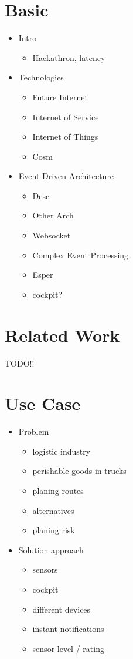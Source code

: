 \documentclass{acm_proc_article-sp}
\begin{document}
\section{Basic}
\begin{itemize}
	\item Intro
	\begin{itemize}	
	\item Hackathron, latency
	\end{itemize}
	\item Technologies
	\begin{itemize}
	\item Future Internet
	\item Internet of Service
	\item Internet of Things
	\item Cosm
	\end{itemize}
	
	\item Event-Driven Architecture	
	\begin{itemize}
	\item Desc
	\item Other Arch
	\item Websocket	
	\item Complex Event Processing	
	\item Esper
	\item cockpit?
	\end{itemize}

\end{itemize}


\section{Related Work}

TODO!!

\section{Use Case}

\begin{itemize}
	\item Problem
	\begin{itemize}
		\item logistic industry
		\item perishable goods in trucks
		\item planing routes
		\item alternatives
		\item planing risk
	\end{itemize}
	
	\item Solution approach
	\begin{itemize}
		\item sensors
		\item cockpit
		\item different devices
		\item instant notifications
		\item sensor level / rating
	\end{itemize}
	
\end{itemize}
\end{document}
